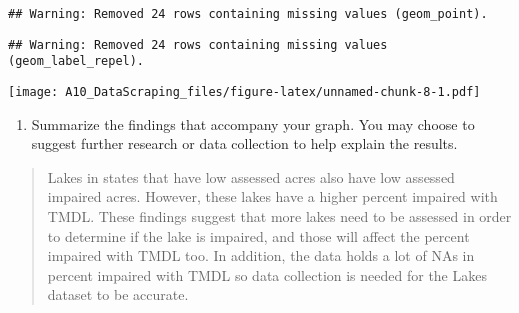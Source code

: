 \documentclass[]{article}
\providecommand{\tightlist}{%
  \setlength{\itemsep}{0pt}\setlength{\parskip}{0pt}}
\begin{document}
\begin{verbatim}
## Warning: Removed 24 rows containing missing values (geom_point).
\end{verbatim}

\begin{verbatim}
## Warning: Removed 24 rows containing missing values (geom_label_repel).
\end{verbatim}

\texttt{[image: A10\_DataScraping\_files/figure-latex/unnamed-chunk-8-1.pdf]}

\begin{enumerate}
\def\labelenumi{\arabic{enumi}.}
\setcounter{enumi}{11}
\tightlist
\item
  Summarize the findings that accompany your graph. You may choose to
  suggest further research or data collection to help explain the
  results.
\end{enumerate}

\begin{quote}
Lakes in states that have low assessed acres also have low assessed
impaired acres. However, these lakes have a higher percent impaired with
TMDL. These findings suggest that more lakes need to be assessed in
order to determine if the lake is impaired, and those will affect the
percent impaired with TMDL too. In addition, the data holds a lot of NAs
in percent impaired with TMDL so data collection is needed for the Lakes
dataset to be accurate.
\end{quote}
\end{document}
